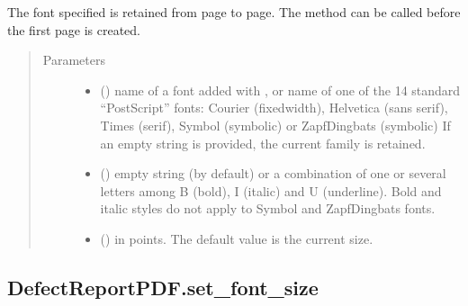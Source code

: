 \documentclass[letterpaper,10pt,english]{sphinxmanual}
\begin{document}
\begin{fulllineitems}
\begin{fulllineitems}
\sphinxAtStartPar
The font specified is retained from page to page.
The method can be called before the first page is created.
\begin{quote}\begin{description}
\item[{Parameters}] \leavevmode\begin{itemize}
\item {} 
\sphinxAtStartPar
{} () \textendash{} name of a font added with ,
or name of one of the 14 standard “PostScript” fonts:
Courier (fixed\sphinxhyphen{}width), Helvetica (sans serif), Times (serif),
Symbol (symbolic) or ZapfDingbats (symbolic)
If an empty string is provided, the current family is retained.

\item {} 
\sphinxAtStartPar
{} () \textendash{} empty string (by default) or a combination
of one or several letters among B (bold), I (italic) and U (underline).
Bold and italic styles do not apply to Symbol and ZapfDingbats fonts.

\item {} 
\sphinxAtStartPar
{} () \textendash{} in points. The default value is the current size.

\end{itemize}

\end{description}\end{quote}

\end{fulllineitems}



\subsection{DefectReportPDF.set\_font\_size}
\label{\detokenize{generated/quality_assessment.quality_pdf_report.DefectReportPDF.set_font_size:defectreportpdf-set-font-size}}\label{\detokenize{generated/quality_assessment.quality_pdf_report.DefectReportPDF.set_font_size::doc}}


\end{fulllineitems}
\end{document}
